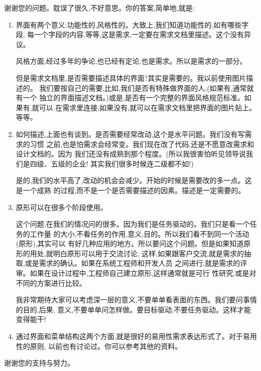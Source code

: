 \documentclass[11pt]{article}
\begin{document}
\begin{yang}

\ylogo 谢谢您的问题。耽误了很久,不好意思。你的答案,简单地,就是:
\begin{enumerate}
  \item 界面有两个意义:功能性的,风格性的。大致上,我们知道功能性的,如有哪些字段,
   每一个字段的内容,等等,这是需求,一定要在需求文档里描述。这个没有异议。

   风格方面,经过多年的争论,也已经有定论,也是需求。所以是需求的一部分。

   但是需求文档里,是否需要描述具体的界面?其实是需要的。我以前使用图片描述的。
   我们要按自己的需要,比如,我们是否有特殊做界面的人,(如果有,通常就有一个
   独立的界面描述文档。)或是,是否有一个完整的界面风格规范标准。如果有,就可以
   在需求里连接,如果没有,就可以在需求文档里把界面的图片贴上。等等。

  \item 如何描述,上面也有谈到。是否需要经常改动,这个是水平问题。我们没有写需求的习惯
   之前,也是怕需求会经常变。我们现在改了代码,还是不愿意改需求和设计文档的。因为
   我们还没有成熟到那个程度。(所以我很害怕听见领导说我们是四级、五级的企业!
   其实我们很多时候连二级都不如!)

   是的,我们的水平高了,改动的机会会减少。开始的时候是需要改的多一点。这是一个成熟
   的过程,而不是一个是否需要描述的因素。描述是一定需要的。

  \item 原形可以在很多个阶段使用。

   这个问题,在我们的情况问的很多。因为我们是任务驱动的。我们只是看一个任务的工作量
   的大小,不看任务的作用,意义,目的。所以我们看不到同一个活动(原形),其实可以
   有好几种应用的地方。所以要问这个问题。但是如果知道原形的用处,就明白原形可以用于交流讨论,
   这样,如果跟客户交流,就是需求的抽取,或是需求的确认。如果在系统工程师和开发人员
   之间进行,就是需求的评审。如果在设计过程中,工程师自己建立原形,这样通常就是可行
   性研究,或是对不同的方案进行比较。

   我非常期待大家可以考虑深一层的意义,不要单单看表面的东西。我们要问事情的目的,后果,
   意义,不要单单问怎样做。要目标驱动,不要任务驱动。这样才能变得能干!

  \item 通过界面和菜单结构这两个方面,就是很好的易用性需求表达形式了。对于易用性的原则,
   以前也有讨论过。你可以参考其他的资料。

\end{enumerate}
谢谢您的支持与努力。
\end{yang}
\end{document}
